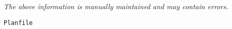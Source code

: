 \label{pkg:planfile}

{\tiny \it The above information is manually maintained and may contain errors.}
\begin{verbatim}
Planfile
\end{verbatim}
